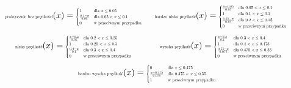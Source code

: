 \documentclass{article}
\begin{document}
\begin{equation*}
\begin{minipage}{0.5\textwidth}
\centering
$\text{\scalebox{0.5}{praktycznie bez prędkości}}(x) = 
\scalebox{0.5}{$
\begin{cases} 
1 & \text{dla } x \leq 0.05 \\
\frac{0.1 - x}{0.05} & \text{dla } 0.05 < x \leq 0.1 \\
0 & \text{w przeciwnym przypadku}
\end{cases}
$}$
\end{minipage}%
\begin{minipage}{0.5\textwidth}
\centering
$\text{\scalebox{0.5}{bardzo niska prędkość}}(x) = 
\scalebox{0.5}{$
\begin{cases} 
\frac{x - 0.05}{0.05} & \text{dla } 0.05 < x \leq 0.1 \\
1 & \text{dla } 0.1 < x \leq 0.2 \\
\frac{0.25 - x}{0.05} & \text{dla } 0.2 < x \leq 0.25 \\
0 & \text{w przeciwnym przypadku}
\end{cases}
$}$
\end{minipage}
\end{equation*}
\begin{equation*}
\begin{minipage}{0.5\textwidth}
\centering
$\text{\scalebox{0.5}{niska prędkość}}(x) = 
\scalebox{0.5}{$
\begin{cases} 
\frac{x - 0.2}{0.05} & \text{dla } 0.2 < x \leq 0.25 \\
1 & \text{dla } 0.25 < x \leq 0.3 \\
\frac{0.4 - x}{0.1} & \text{dla } 0.3 < x \leq 0.4 \\
0 & \text{w przeciwnym przypadku}
\end{cases}
$}$
\end{minipage}%
\begin{minipage}{0.5\textwidth}
\centering
$\text{\scalebox{0.5}{wysoka prędkość}}(x) = 
\scalebox{0.5}{$
\begin{cases} 
\frac{x - 0.3}{0.1} & \text{dla } 0.3 < x \leq 0.4 \\
1 & \text{dla } 0.4 < x \leq 0.475 \\
\frac{0.55 - x}{0.075} & \text{dla } 0.475 < x \leq 0.55 \\
0 & \text{w przeciwnym przypadku}
\end{cases}
$}$
\end{minipage}
\end{equation*}
\begin{equation*}
\text{\scalebox{0.5}{bardzo wysoka prędkość}}(x) = 
\scalebox{0.5}{$
\begin{cases} 
0 & \text{dla } x \leq 0.475 \\
\frac{x - 0.475}{0.075} & \text{dla } 0.475 < x \leq 0.55 \\
1 & \text{w przeciwnym przypadku}
\end{cases}
$}
\end{equation*}
\end{document}
